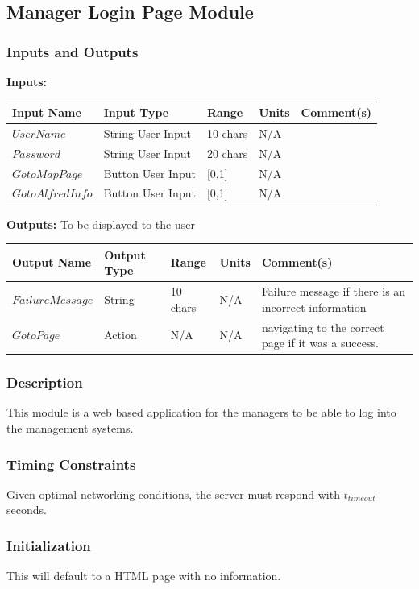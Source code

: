 \documentclass [10pt]{article}
\begin{document}
\subsection{Manager Login Page Module}

\subsubsection{Inputs and Outputs}



\textbf{Inputs: } 

\begin{longtable}{|l|l|l|l|l|}\hline 
	\rowcolor{tableCell}Input Name & Input Type & Range & Units & Comment(s) \\ \hline
	$  UserName $ & String User Input & 10 chars & N/A & \\ \hline
	$  Password $ & String User Input & 20 chars  & N/A & \\ \hline
	$  GotoMapPage $ & Button User Input & [0,1]  & N/A & \\ \hline
	$  GotoAlfredInfo $ & Button User Input & [0,1]  & N/A & \\ \hline
\end{longtable}


\textbf{Outputs: } To be displayed to the user
\begin{longtable}{|l|l|l|l|l|}\hline 
	\rowcolor{tableCell}Output Name & Output Type & Range & Units & Comment(s) \\ \hline
	$  FailureMessage $ & String & 10 chars & N/A & Failure message if there is an incorrect information  \\ \hline
	$  GotoPage $ & Action & N/A  & N/A & navigating to the correct page if it was a success. \\ \hline
\end{longtable}

\subsubsection{Description}
This module is a web based application for the managers to be able to log into the management systems.
\subsubsection{Timing Constraints}
Given optimal networking conditions, the server must respond with $ t_{timeout} $ seconds.

\subsubsection{Initialization}
This will default to a HTML page with no information.
\end{document}
